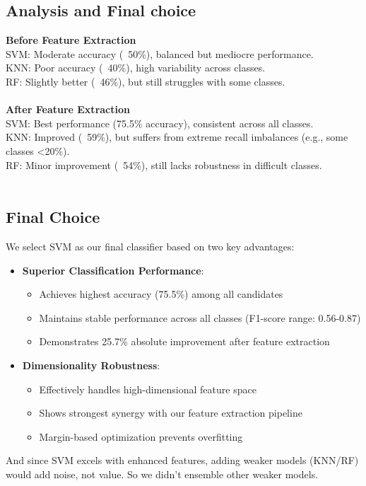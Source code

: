 \documentclass[a4paper,11pt]{article}
\begin{document}
\subsection{Analysis and Final choice}
\textbf{Before Feature Extraction}
\\SVM: Moderate accuracy (~50\%), balanced but mediocre performance.
\\KNN: Poor accuracy (~40\%), high variability across classes.
\\RF: Slightly better (~46\%), but still struggles with some classes.
\\
\\
\textbf{After Feature Extraction}
\\SVM: Best performance (75.5\% accuracy), consistent across all classes.
\\KNN: Improved (~59\%), but suffers from extreme recall imbalances (e.g., some classes <20\%).
\\RF: Minor improvement (~54\%), still lacks robustness in difficult classes.
\\
\\

\subsection{Final Choice}
We select SVM as our final classifier based on two key advantages:

\begin{itemize}
    \item \textbf{Superior Classification Performance}:
    \begin{itemize}
        \item Achieves highest accuracy (75.5\%) among all candidates
        \item Maintains stable performance across all classes (F1-score range: 0.56-0.87)
        \item Demonstrates 25.7\% absolute improvement after feature extraction
    \end{itemize}
    
    \item \textbf{Dimensionality Robustness}:
    \begin{itemize}
        \item Effectively handles high-dimensional feature space
        \item Shows strongest synergy with our feature extraction pipeline
        \item Margin-based optimization prevents overfitting
    \end{itemize}
\end{itemize}
And since SVM excels with enhanced features, adding weaker models (KNN/RF) would add noise, not value. So we didn't ensemble other weaker models.
\end{document}

